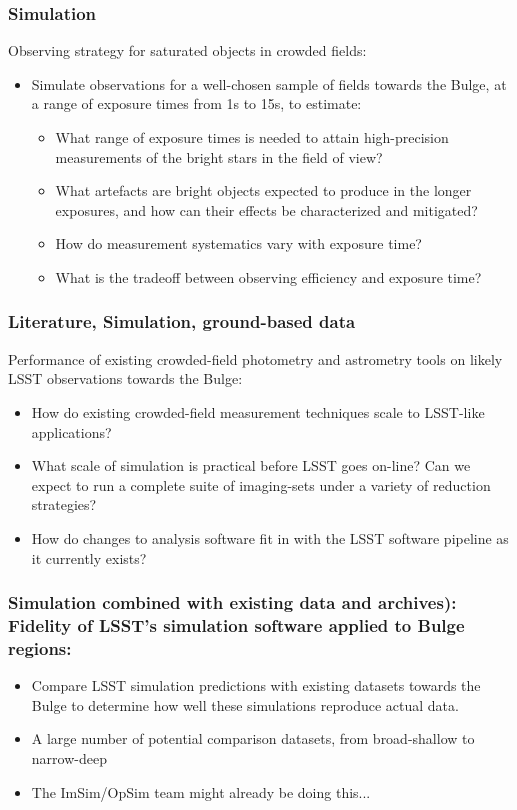\subsubsection{Simulation}
Observing strategy for saturated objects in crowded fields: 
\begin{itemize}
\item{Simulate observations for a well-chosen sample of fields towards the Bulge, at a range of exposure times 
from 1s to 15s, to estimate: 
\begin{itemize}
\item What range of exposure times is needed to attain high-precision measurements of the bright 
stars in the field of view? 
\item What artefacts are bright objects expected to produce in the longer exposures, and how can 
their effects be characterized and mitigated? 
\item How do measurement systematics vary with exposure time? 
\item What is the tradeoff between observing efficiency and exposure time? 
\end{itemize}
}
\end{itemize}

\subsubsection{Literature, Simulation, ground-based data}
Performance of existing crowded-field photometry and astrometry tools on likely LSST observations towards the Bulge: 
\begin{itemize}
\item How do existing crowded-field measurement techniques scale to LSST-like applications? 
\item{What scale of simulation is practical before LSST goes on-line? Can we expect to run a complete suite of 
imaging-sets under a variety of reduction strategies? }
\item{How do changes to analysis software fit in with the LSST software pipeline as it currently exists? }
\end{itemize}

\subsubsection{Simulation combined with existing data and archives): Fidelity of LSST’s simulation software applied to Bulge regions: }
\begin{itemize}
\item{Compare LSST simulation predictions with existing datasets towards the Bulge to determine how well these simulations reproduce actual data. }
\item{A large number of potential comparison datasets, from broad-shallow to narrow-deep}
\item{The ImSim/OpSim team might already be doing this... }
\end{itemize}

